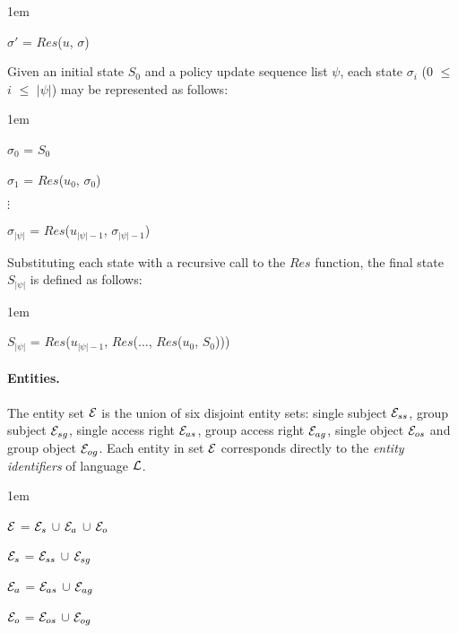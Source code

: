 \documentclass[glov2,twocolumn,final]{svjour2}
\newenvironment{vquote}
  {\begin{list}{}{\leftmargin 1em}\item[]}
  {\end{list}}
\begin{document}
        \begin{vquote}
          $\sigma'$ = $Res$($u$, $\sigma$)
        \end{vquote}

        Given an initial state $S_{0}$ and a policy update sequence list
        $\psi$, each state $\sigma_{i}$ ($0$ $\leq$ $i$ $\leq$ $|\psi|$)
        may be represented as follows:

        \begin{vquote}
          $\sigma_{0}$ = $S_{0}$

          $\sigma_{1}$ = $Res$($u_{0}$, $\sigma_{0}$)

          $\vdots$

          $\sigma_{|\psi|}$ = $Res$($u_{|\psi| - 1}$, $\sigma_{|\psi| - 1}$)
        \end{vquote}

        Substituting each state with a recursive call to the $Res$ function,
        the final state $S_{|\psi|}$ is defined as follows:

        \begin{vquote}
          $S_{|\psi|}$ = $Res$($u_{|\psi| - 1}$, $Res$($\ldots$, $Res$($u_{0}$, $S_{0}$)))
        \end{vquote}

        \paragraph{Entities.}

          The entity set ${\cal E}$ is the union of six disjoint entity sets:
          single subject ${\cal E}_{ss}$, group subject ${\cal E}_{sg}$,
          single access right ${\cal E}_{as}$, group access right
          ${\cal E}_{ag}$, single object ${\cal E}_{os}$ and group object
          ${\cal E}_{og}$. Each entity in set ${\cal E}$ corresponds directly
          to the {\em entity identifiers} of language ${\cal L}$.

          \begin{vquote}
            ${\cal E}$ =
            ${\cal E}_{s}$ $\cup$ ${\cal E}_{a}$ $\cup$ ${\cal E}_{o}$

            ${\cal E}_{s}$ = ${\cal E}_{ss}$ $\cup$ ${\cal E}_{sg}$

            ${\cal E}_{a}$ = ${\cal E}_{as}$ $\cup$ ${\cal E}_{ag}$

            ${\cal E}_{o}$ = ${\cal E}_{os}$ $\cup$ ${\cal E}_{og}$
          \end{vquote}
\end{document}
